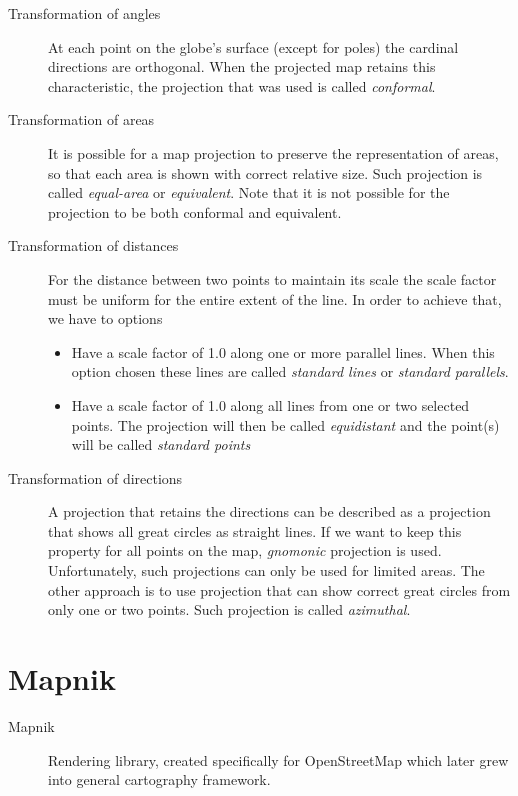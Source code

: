 \documentclass[letterpaper]{article}
\begin{document}
\begin{description}
\item[Transformation of angles] At each point on the globe's surface (except for poles) the cardinal directions are orthogonal. When the projected map retains this characteristic, the projection
that was used is called \emph{conformal}.
\item[Transformation of areas] It is possible for a map projection to preserve the
representation of areas, so that each area is shown with correct relative size. Such
projection is called \emph{equal-area} or \emph{equivalent}. Note that it is not
possible for the projection to be both conformal and equivalent.
\item[Transformation of distances] For the distance between two points to maintain
  its scale the scale factor must be uniform for the entire extent of the line.
  In order to achieve that, we have to options
  \begin{itemize}
  \item Have a scale factor of 1.0 along one or more parallel lines. When this option
    chosen these lines are called \emph{standard lines} or \emph{standard parallels}.
  \item Have a scale factor of 1.0 along all lines from one or two selected points.
    The projection will then be called \emph{equidistant} and the point(s) will be called
    \emph{standard points}
  \end{itemize}
\item[Transformation of directions] A projection that retains the directions can be
  described as a projection that shows all great circles as straight lines. If we want
  to keep this property for all points on the map, \emph{gnomonic} projection is used.
  Unfortunately, such projections can only be used for limited areas. The other approach
  is to use projection that can show correct great circles from only one or two points.
  Such projection is called \emph{azimuthal}.
\end{description}

\pagebreak

\section{Mapnik}
\label{sec:mapnik}

\begin{description}
\item[Mapnik] Rendering library, created specifically for OpenStreetMap which later grew
  into general cartography framework.
\end{description}
\end{document}
